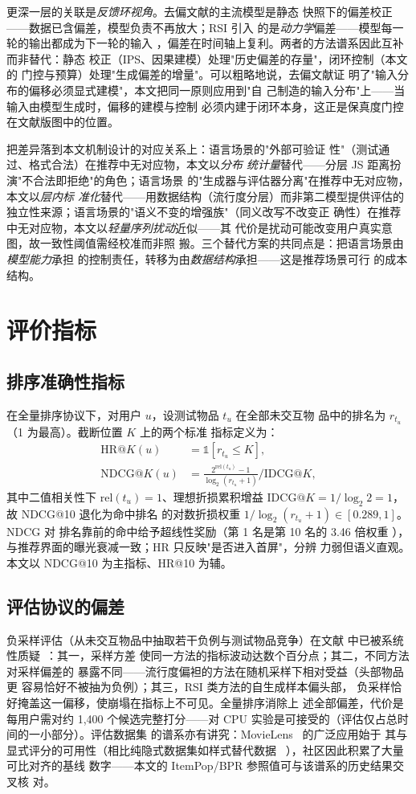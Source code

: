 \bigskip\noindent
更深一层的关联是\emph{反馈环视角}。去偏文献的主流模型是静态
快照下的偏差校正——数据已含偏差，模型负责不再放大；RSI 引入
的是\emph{动力学}偏差——模型每一轮的输出都成为下一轮的输入
，偏差在时间轴上复利。两者的方法谱系因此互补而非替代：静态
校正（IPS、因果建模）处理"历史偏差的存量"，闭环控制（本文的
门控与预算）处理"生成偏差的增量"。可以粗略地说，去偏文献证
明了"输入分布的偏移必须显式建模"，本文把同一原则应用到"自
己制造的输入分布"上——当输入由模型生成时，偏移的建模与控制
必须内建于闭环本身，这正是保真度门控在文献版图中的位置。

把差异落到本文机制设计的对应关系上：语言场景的"外部可验证
性"（测试通过、格式合法）在推荐中无对应物，本文以\emph{分布
统计量}替代——分层 JS 距离扮演"不合法即拒绝"的角色；语言场景
的"生成器与评估器分离"在推荐中无对应物，本文以\emph{层内标
准化}替代——用数据结构（流行度分层）而非第二模型提供评估的
独立性来源；语言场景的"语义不变的增强族"（同义改写不改变正
确性）在推荐中无对应物，本文以\emph{轻量序列扰动}近似——其
代价是扰动可能改变用户真实意图，故一致性阈值需经校准而非照
搬。三个替代方案的共同点是：把语言场景由\emph{模型能力}承担
的控制责任，转移为由\emph{数据结构}承担——这是推荐场景可行
的成本结构。

\section{评价指标}
\subsection{排序准确性指标}
在全量排序协议下，对用户 $u$，设测试物品 $t_u$ 在全部未交互物
品中的排名为 $r_{t_u}$（1 为最高）。截断位置 $K$ 上的两个标准
指标定义为：
\begin{align}
\mathrm{HR}@K(u) &= \mathbb{1}[r_{t_u} \le K], \\
\mathrm{NDCG}@K(u) &= \frac{2^{\mathrm{rel}(t_u)} - 1}
{\log_2(r_{t_u} + 1)} \bigg/ \mathrm{IDCG}@K,
\end{align}
其中二值相关性下 $\mathrm{rel}(t_u) = 1$、理想折损累积增益
$\mathrm{IDCG}@K = 1/\log_2 2 = 1$，故 NDCG@10 退化为命中排名
的对数折损权重 $1/\log_2(r_{t_u} + 1) \in [0.289, 1]$。NDCG 对
排名靠前的命中给予超线性奖励（第 1 名是第 10 名的 3.46 倍权重
），与推荐界面的曝光衰减一致；HR 只反映"是否进入首屏"，分辨
力弱但语义直观。本文以 NDCG@10 为主指标、HR@10 为辅。

\subsection{评估协议的偏差}
负采样评估（从未交互物品中抽取若干负例与测试物品竞争）在文献
中已被系统性质疑~\cite{dacrema2019worrying}：其一，采样方差
使同一方法的指标波动达数个百分点；其二，不同方法对采样偏差的
暴露不同——流行度偏袒的方法在随机采样下相对受益（头部物品更
容易恰好不被抽为负例）；其三，RSI 类方法的自生成样本偏头部，
负采样恰好掩盖这一偏移，使崩塌在指标上不可见。全量排序消除上
述全部偏差，代价是每用户需对约 1{,}400 个候选完整打分——对
CPU 实验是可接受的（评估仅占总时间的一小部分）。评估数据集
的谱系亦有讲究：MovieLens~\cite{harper2015ml} 的广泛应用始于
其与显式评分的可用性（相比纯隐式数据集如样式替代数据
~\cite{mcauley2015image}），社区因此积累了大量可比对齐的基线
数字——本文的 ItemPop/BPR 参照值可与该谱系的历史结果交叉核
对。


